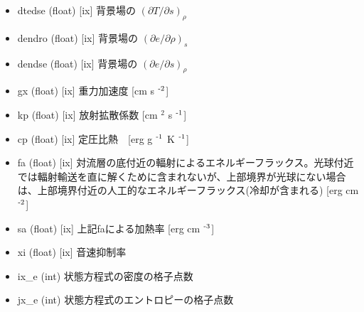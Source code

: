 \documentclass[letterpaper,10pt,dvipdfmx,report]{sphinxmanual}
\begin{document}
\begin{itemize}
\item {} 
dtedse (float) {[}ix{]} \sphinxhyphen{}\sphinxhyphen{} 背景場の \((\partial T/\partial s)_\rho\)

\item {} 
dendro (float) {[}ix{]} \sphinxhyphen{}\sphinxhyphen{} 背景場の \((\partial e/\partial \rho)_s\)

\item {} 
dendse (float) {[}ix{]} \sphinxhyphen{}\sphinxhyphen{} 背景場の \((\partial e/\partial s)_\rho\)

\item {} 
gx (float) {[}ix{]} \sphinxhyphen{}\sphinxhyphen{} 重力加速度 {[}cm s $^{\text{\sphinxhyphen{}2}}${]}

\item {} 
kp (float) {[}ix{]} \sphinxhyphen{}\sphinxhyphen{} 放射拡散係数 {[}cm $^{\text{2}}$ s $^{\text{\sphinxhyphen{}1}}${]}

\item {} 
cp (float) {[}ix{]} \sphinxhyphen{}\sphinxhyphen{} 定圧比熱　{[}erg g $^{\text{\sphinxhyphen{}1}}$ K $^{\text{\sphinxhyphen{}1}}${]}

\item {} 
fa (float) {[}ix{]} \sphinxhyphen{}\sphinxhyphen{} 対流層の底付近の輻射によるエネルギーフラックス。光球付近では輻射輸送を直に解くために含まれないが、上部境界が光球にない場合は、上部境界付近の人工的なエネルギーフラックス(冷却が含まれる) {[}erg cm $^{\text{\sphinxhyphen{}2}}${]}

\item {} 
sa (float) {[}ix{]} \sphinxhyphen{}\sphinxhyphen{} 上記faによる加熱率 {[}erg cm $^{\text{\sphinxhyphen{}3}}${]}

\item {} 
xi (float) {[}ix{]} \sphinxhyphen{}\sphinxhyphen{} 音速抑制率

\item {} 
ix\_e (int) \sphinxhyphen{}\sphinxhyphen{} 状態方程式の密度の格子点数

\item {} 
jx\_e (int) \sphinxhyphen{}\sphinxhyphen{} 状態方程式のエントロピーの格子点数

\end{itemize}
\end{document}
